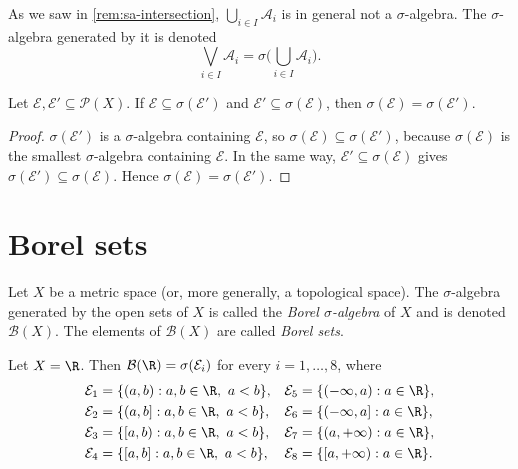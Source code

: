 
\begin{remark}\label{rem:sa-join}
As we saw in \cref{rem:sa-intersection}, $\bigcup_{i\in I}\mathcal A_i$ is in general not a
$\sigma$-algebra. The $\sigma$-algebra generated by it is denoted
\[
  \bigvee_{i\in I}\mathcal A_i=\sigma\Big(\bigcup_{i\in I}\mathcal A_i\Big).
\]
\end{remark}

\begin{proposition}\label{prop:sa-same-generated}
Let $\mathcal E,\mathcal E'\subseteq\mathcal P(X)$. If $\mathcal E\subseteq\sigma(\mathcal E')$
and $\mathcal E'\subseteq\sigma(\mathcal E)$, then $\sigma(\mathcal E)=\sigma(\mathcal E')$.
\end{proposition}

\begin{proof}
$\sigma(\mathcal E')$ is a $\sigma$-algebra containing $\mathcal E$, so
$\sigma(\mathcal E)\subseteq\sigma(\mathcal E')$, because $\sigma(\mathcal E)$ is the smallest
$\sigma$-algebra containing $\mathcal E$. In the same way,
$\mathcal E'\subseteq\sigma(\mathcal E)$ gives $\sigma(\mathcal E')\subseteq\sigma(\mathcal E)$.
Hence $\sigma(\mathcal E)=\sigma(\mathcal E')$.
\end{proof}

\section{Borel sets}\label{sec:sa-borel}

\begin{definition}\label{def:sa-borel}
Let $X$ be a metric space (or, more generally, a topological space). The $\sigma$-algebra
generated by the open sets of $X$ is called the \emph{Borel $\sigma$-algebra} of $X$ and is
denoted $\mathcal B(X)$. The elements of $\mathcal B(X)$ are called \emph{Borel sets}.
\end{definition}

\begin{proposition}\label{prop:sa-borel-generators}
Let $X=\R$. Then $\mathcal B(\R)=\sigma(\mathcal E_i)$ for every $i=1,\dots,8$, where
\begin{align*}
  \mathcal E_1&=\{(a,b):a,b\in\R,\ a<b\}, & \mathcal E_5&=\{(-\infty,a):a\in\R\},\\
  \mathcal E_2&=\{(a,b]:a,b\in\R,\ a<b\}, & \mathcal E_6&=\{(-\infty,a]:a\in\R\},\\
  \mathcal E_3&=\{[a,b):a,b\in\R,\ a<b\}, & \mathcal E_7&=\{(a,+\infty):a\in\R\},\\
  \mathcal E_4&=\{[a,b]:a,b\in\R,\ a<b\}, & \mathcal E_8&=\{[a,+\infty):a\in\R\}.
\end{align*}
\end{proposition}

